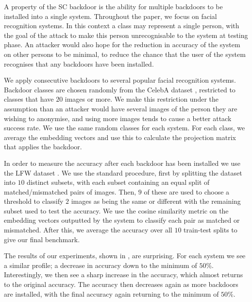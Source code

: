 \documentclass{article}
\theoremstyle{plain}
\theoremstyle{definition}
\theoremstyle{remark}
\begin{document}
A property of the SC backdoor is the ability for multiple backdoors to be installed into a single system. Throughout the paper, we focus on facial recognition systems. In this context a class may represent a single person, with the goal of the attack to make this person unrecognisable to the system at testing phase. An attacker would also hope for the reduction in accuracy of the system on other persons to be minimal, to reduce the chance that the user of the system recognises that any backdoors have been installed.

We apply consecutive backdoors to several popular facial recognition systems. Backdoor classes are chosen randomly from the CelebA dataset , restricted to classes that have \( 20 \) images or more. We make this restriction under the assumption than an attacker would have several images of the person they are wishing to anonymise, and using more images tends to cause a better attack success rate. We use the same random classes for each system. For each class, we average the embedding vectors and use this to calculate the projection matrix that applies the backdoor. 

In order to measure the accuracy after each backdoor has been installed we use the LFW dataset . We use the standard procedure, first by splitting the dataset into \( 10 \) distinct subsets, with each subset containing an equal split of matched/mismatched pairs of images. Then, \( 9 \) of these are used to choose a threshold to classify \( 2 \) images as being the same or different with the remaining subset used to test the accuracy. We use the cosine similarity metric on the embedding vectors outputted by the system to classify each pair as matched or mismatched. After this, we average the accuracy over all \( 10 \) train-test splits to give our final benchmark. 


The results of our experiments, shown in , are surprising. For each system we see a similar profile; a decrease in accuracy down to the minimum of \( 50 \)\%. Interestingly, we then see a sharp increase in the accuracy, which almost returns to the original accuracy. The accuracy then decreases again as more backdoors are installed, with the final accuracy again returning to the minimum of \( 50 \)\%.
\end{document}

